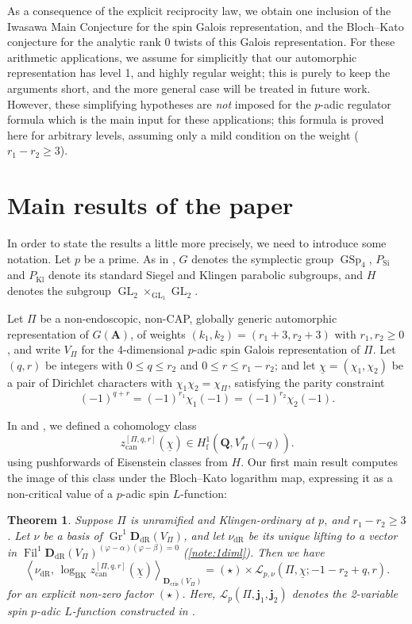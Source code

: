 \documentclass[cjm]{ipart}
\theoremstyle{plain}
\newtheorem{introtheorem}{Theorem}
\theoremstyle{remark}
\DeclareMathOperator{\Fil}{Fil}
\DeclareMathOperator{\GL}{GL}
\DeclareMathOperator{\Gr}{Gr}
\DeclareMathOperator{\GSp}{GSp}
\DeclareMathOperator{\Kl}{Kl}
\DeclareMathOperator{\Sieg}{Si}
\newcommand{\Dcris}{\mathbf{D}_{\mathrm{cris}}}
\newcommand{\DdR}{\mathbf{D}_{\mathrm{dR}}}
\newcommand{\QQ}{\mathbf{Q}}
\newcommand{\bfj}{\mathbf{j}}
\newcommand{\cL}{\mathcal{L}}
\newcommand{\can}{\mathrm{can}}
\newcommand{\dR}{\mathrm{dR}}
\newcommand{\uchi}{\underline{\chi}}
\renewcommand{\AA}{\mathbf{A}}
\numberwithin{equation}{subsection}
\renewcommand{\le}{\leqslant}
\renewcommand{\ge}{\geqslant}
\renewcommand{\geq}{\geqslant}
\begin{document}
 As a consequence of the explicit reciprocity law, we obtain one inclusion of the Iwasawa Main Conjecture for the spin Galois representation, and the Bloch--Kato conjecture for the analytic rank 0 twists of this Galois representation. For these arithmetic applications, we assume for simplicitly that our automorphic representation has level 1, and highly regular weight; this is purely to keep the arguments short, and the more general case will be treated in future work. However, these simplifying hypotheses are \emph{not} imposed for the $p$-adic regulator formula which is the main input for these applications; this formula is proved here for arbitrary levels, assuming only a mild condition on the weight ($r_1 - r_2 \ge 3$).

\section{Main results of the paper}

 In order to state the results a little more precisely, we need to introduce some notation. Let $p$ be a prime. As in \cite[\S 2]{LSZ17}, $G$ denotes the symplectic group $\GSp_4$, $P_{\Sieg}$ and $P_{\Kl}$ denote its standard Siegel and Klingen parabolic subgroups, and $H$ denotes the subgroup $\GL_2 \times_{\GL_1} \GL_2$.

 Let $\Pi$ be a non-endoscopic, non-CAP, globally generic automorphic representation of $G(\AA)$, of weights $(k_1,k_2)=(r_1+3,r_2+3)$ with $r_1,r_2\geq 0$, and write $V_\Pi$ for the 4-dimensional $p$-adic spin Galois representation of $\Pi$. Let $(q, r)$ be integers with $0 \le q \le r_2$ and $0 \le r \le r_1 - r_2$; and let $\uchi = (\chi_1, \chi_2)$ be a pair of Dirichlet characters with $\chi_1 \chi_2 = \chi_\Pi$, satisfying the parity constraint
 \[ (-1)^{q + r} = (-1)^{r_1} \chi_1(-1) = (-1)^{r_2} \chi_2(-1).\]

 In \cite{LSZ17} and \cite{LZ-equivar}, we defined a cohomology class
 \[ z^{[\Pi, q, r]}_{\can}(\uchi) \in H^1_{\mathrm{f}}\left(\QQ, V_{\Pi}^*(-q)\right). \]
 using pushforwards of Eisenstein classes from $H.$ Our first main result computes the image of this class under the Bloch--Kato logarithm map, expressing it as a non-critical value of a $p$-adic spin $L$-function:

 \begin{introtheorem}
  \label{thm:main}
  Suppose $\Pi$ is unramified and Klingen-ordinary at $p$, and $r_1 - r_2 \ge 3$. Let $\nu$ be a basis of $\Gr^1 \DdR(V_{\Pi})$, and let $\nu_{\dR}$ be its unique lifting to a vector in $\Fil^1 \DdR(V_{\Pi})^{(\varphi - \alpha)(\varphi-\beta) = 0}$ (\cref{note:1diml}). Then we have
  \[  \left\langle \nu_{\dR},\, \log_{\mathrm{BK}} z^{[\Pi, q, r]}_{\can}(\uchi) \right\rangle_{\Dcris(V_\Pi)}=
  (\star)\times \cL_{p, \nu}(\Pi, \uchi; -1-r_2+q, r). \]
  for an explicit non-zero factor $(\star)$. Here, $\cL_{p}(\Pi, \bfj_1, \bfj_2)$ denotes the 2-variable spin $p$-adic $L$-function constructed in \cite{LPSZ1}.
 \end{introtheorem}
\end{document}
